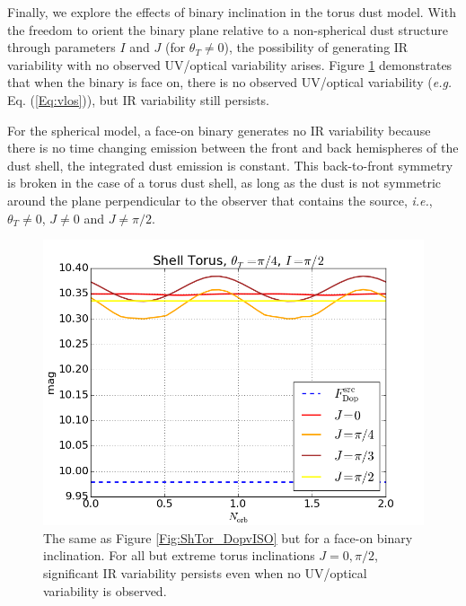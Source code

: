 Finally, we explore the effects of binary inclination in the torus dust model.
With the freedom to orient the binary plane relative to a non-spherical dust
structure through parameters $I$ and $J$ (for $\theta_T \neq 0$), the
possibility of generating IR variability with no observed UV/optical variability
arises. Figure \ref{Fig:ShTor_VarI} demonstrates that when the binary is
face on, there is no observed UV/optical variability (\textit{e.g.} Eq.
(\ref{Eq:vlos})), but IR variability still persists. 

For the spherical model, a face-on binary generates no IR variability because
there is no time changing emission between the front and back hemispheres of
the dust shell, the integrated dust emission is constant. This back-to-front
symmetry is broken in the case of a torus dust shell, as long as the dust is
not symmetric around the plane perpendicular to the observer that contains
the source, \textit{i.e.}, $\theta_T \neq 0$, $J\neq 0$ and $J\neq \pi/2$.




\begin{figure}
\begin{center}
\includegraphics[scale=0.33]{figures/ch5/ShTor_Thin/FDop_ShTor_Thin_nrm0__Rin2p73218e+18_Inc1p5708_thetaT0p785398_VaryJ_numin0_numx6} 
\end{center}
%
\caption{The same as Figure \ref{Fig:ShTor_DopvISO} but for a face-on binary
inclination. For all but extreme torus inclinations $J=0, \pi/2$,
significant IR variability persists even when no UV/optical variability is
observed.}
%
\label{Fig:ShTor_VarI}
\end{figure}


























